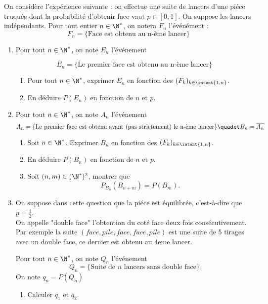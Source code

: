 \documentclass[a4paper, 11pt,reqno]{article}
\begin{document}
\begin{exercice}
On considère l'expérience suivante : on effectue une suite de lancers d'une piéce truquée dont la probabilité d'obtenir face vaut $p\in [0,1]$. On suppose les lancers indépendants. 
Pour tout entier $n\in \N^*$, on notera $F_n$ l'événément :
$$F_n=\{ \text{Face  est obtenu au n-ème lancer}\}$$

\begin{enumerate}
\item Pour tout $n\in \N^*$, on note $E_n$ l'événement 

$$E_n=\{ \text{Le premier face est obtenu au  n-ème lancer}\}$$


\begin{enumerate}
\item  Pour tout $n\in \N^*$, exprimer $E_n$ en fonction des $(F_k)_{k\in \intent{1,n}}$.
\item En déduire $P(E_n)$ en fonction de $n$ et $p$.\\
\end{enumerate}

\item 
Pour tout $n\in \N^*$, on note $A_n$ l'événement 
$$A_n=\{ \text{Le premier face est obtenu avant (pas strictement)  le n-ème lancer}\} \quadet B_n =\overline{A_n}$$
\begin{enumerate}
\item Soit $n\in \N^*$. Exprimer $B_n$ en fonction des $(F_k)_{k\in \intent{1,n}}$.
\item En déduire $P(B_n)$ en fonction de $n$ et $p$.
\item Soit $(n,m)\in(\N^*)^2$, montrer que  $$P_{B_n}(B_{n+m} )=P(B_m).$$ 
\end{enumerate}
\item On suppose dans cette question que la piéce est équilibrée, c'est-à-dire que $p=\frac{1}{2}$.\\

On appelle "double face" l'obtention du coté face deux fois consécutivement. Par exemple la suite $(face, pile , face , face, pile)$  est une suite de 5 tirages avec un double face, ce dernier est obtenu au 4eme lancer. 

Pour tout $n\in \N^*$, on note $Q_n$ l'événement 
$$Q_n=\{ \text{Suite de $n$ lancers sans double face}\} $$
On note $q_n = P(Q_n)$
\begin{enumerate}
\item  Calculer $q_1$ et $q_2$.\\


\end{enumerate}
\end{enumerate}
\end{exercice}
\end{document}
